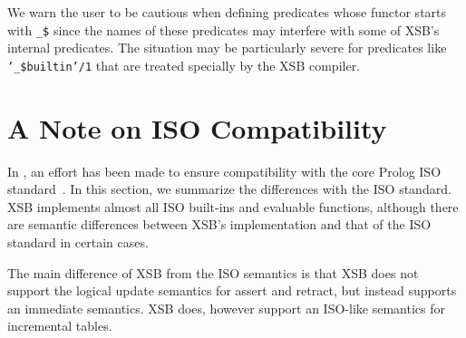 \begin{table}[htbp]
\caption{The Inline Predicates of XSB}\label{inlinepredicatetable}
\end{table}

We warn the user to be cautious when defining predicates whose functor
starts with {\tt \_\$} since the names of these predicates may
interfere with some of XSB's internal predicates.  The situation may
be particularly severe for predicates like {\tt '\_\$builtin'/1} that
are treated specially by the XSB compiler.

\section{A Note on ISO Compatibility} \label{sec:iso}

In \version, an effort has been made to ensure compatibility with the
core Prolog ISO standard~\cite{ISO-Prolog}.  In this section, we
summarize the differences with the ISO standard.  XSB implements
almost all ISO built-ins and evaluable functions, although there are
semantic differences between XSB's implementation and that of the ISO
standard in certain cases.

The main difference of XSB from the ISO semantics is that XSB does not
support the logical update semantics for assert and retract, but
instead supports an immediate semantics.  XSB does, however support an
ISO-like semantics for incremental tables.


